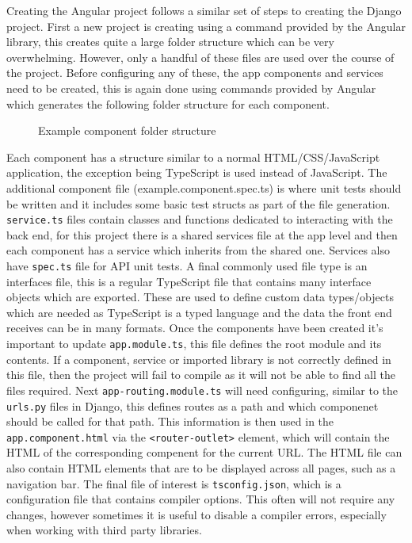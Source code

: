Creating the Angular project follows a similar set of steps to creating the Django project. First a new project is creating using a command 
provided by the Angular library, this creates quite a large folder structure which can be very overwhelming. However, only a handful of these files 
are used over the course of the project. Before configuring any of these, the app components and services need to be created, this is again done using commands provided 
by Angular which generates the following folder structure for each component.
\begin{figure}
    \caption{Example component folder structure}
\end{figure}
Each component has a structure similar to a normal HTML/CSS/JavaScript application, the exception being TypeScript is used instead of JavaScript.
The additional component file (example.component.spec.ts) is where unit tests should be written and it includes some basic test structs as part of the 
file generation. \verb|service.ts| files contain classes and functions dedicated to interacting with the back end, for this project there is a shared services file at 
the app level and then each component has a service which inherits from the shared one. Services also have \verb|spec.ts| file for API unit tests.
A final commonly used file type is an interfaces file, this is a regular TypeScript file that contains many interface objects which are exported. 
These are used to define custom data types/objects which are needed as TypeScript is a typed language and the data the front end receives can be in many formats.
Once the components have been created it's important to update \verb|app.module.ts|, this file defines the root module and its contents. 
If a component, service or imported library is not correctly defined in this file, then the project will fail to compile as it will not be able to find all the files required.
Next \verb|app-routing.module.ts| will need configuring, similar to the \verb|urls.py| files in Django, this defines routes as a path and which componenet should be called for that path.
This information is then used in the \verb|app.component.html| via the \verb|<router-outlet>| element, which will contain the HTML of the corresponding compenent for the current URL.
The HTML file can also contain HTML elements that are to be displayed across all pages, such as a navigation bar.
The final file of interest is \verb|tsconfig.json|, which is a configuration file that contains compiler options. This often will not require any changes, however 
sometimes it is useful to disable a compiler errors, especially when working with third party libraries.

